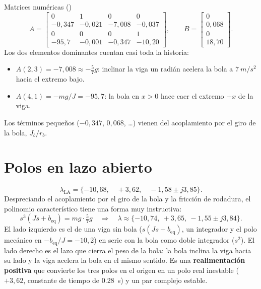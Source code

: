 \begin{ejemplo}{Matrices numéricas ()}
\[
A=\begin{bmatrix}0&1&0&0\\ -0{,}347&-0{,}021&-7{,}008&-0{,}037\\ 0&0&0&1\\ -95{,}7&-0{,}001&-0{,}347&-10{,}20\end{bmatrix},\qquad
B=\begin{bmatrix}0\\ 0{,}068\\ 0\\ 18{,}70\end{bmatrix}.
\]
Los dos elementos dominantes cuentan casi toda la historia:
\begin{itemize}
  \item $A(2,3)=-7{,}008\approx-\tfrac57g$: inclinar la viga un radián acelera la bola a $\SI{7}{m/s^2}$ hacia el extremo bajo.
  \item $A(4,1)=-mg/J=-95{,}7$: la bola en $x>0$ hace caer el extremo $+x$ de la viga.
\end{itemize}
Los términos pequeños ($-0{,}347$, $0{,}068$, \ldots) vienen del acoplamiento por el giro de la bola, $J_b/r_b$.
\end{ejemplo}

\section{Polos en lazo abierto}

\begin{equation}
  \lambda_{\text{LA}} = \{-10{,}68,\quad +3{,}62,\quad -1{,}58\pm j3{,}85\}.
\end{equation}
Despreciando el acoplamiento por el giro de la bola y la fricción de rodadura, el polinomio característico tiene una forma muy instructiva:
\begin{equation}
  s^3\left(Js + b_{\text{eq}}\right) = mg\cdot\tfrac57 g
  \quad\Longrightarrow\quad
  \lambda\approx\{-10{,}74,\ +3{,}65,\ -1{,}55\pm j3{,}84\}.
  \label{eq:caract}
\end{equation}
El lado izquierdo es el de una viga sin bola ($s(Js+b_{\text{eq}})$, un integrador y el polo mecánico en $-b_{\text{eq}}/J=-10{,}2$) en serie con la bola como doble integrador ($s^2$). El lado derecho es el lazo que cierra el peso de la bola: la bola inclina la viga hacia su lado y la viga acelera la bola en el mismo sentido. Es una \textbf{realimentación positiva} que convierte los tres polos en el origen en un polo real inestable ($+3{,}62$, constante de tiempo de \SI{0.28}{s}) y un par complejo estable.

